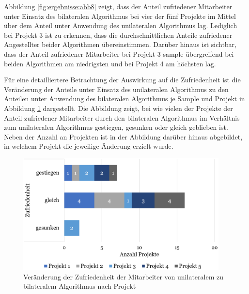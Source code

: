 Abbildung \ref{fig:ergebnisse:abb8} zeigt, dass der Anteil zufriedener Mitarbeiter unter Einsatz des bilateralen Algorithmus bei vier der fünf Projekte im Mittel über dem Anteil unter Anwendung des unilateralen Algorithmus lag.
Lediglich bei Projekt 3 ist zu erkennen, dass die durchschnittlichen Anteile zufriedener Angestellter beider Algorithmen übereinstimmen.
Darüber hinaus ist sichtbar, dass der Anteil zufriedener Mitarbeiter bei Projekt 3 sample-übergreifend bei beiden Algorithmen am niedrigsten und bei Projekt 4 am höchsten lag.

Für eine detailliertere Betrachtung der Auswirkung auf die Zufriedenheit ist die Veränderung der Anteile unter Einsatz des unilateralen Algorithmus zu den Anteilen unter Anwendung des bilateralen Algorithmus je Sample und Projekt in Abbildung \ref{fig:ergebnisse:abb9} dargestellt.
Die Abbildung zeigt, bei wie vielen der Projekte der Anteil zufriedener Mitarbeiter durch den bilateralen Algorithmus im Verhältnis zum unilateralen Algorithmus gestiegen, gesunken oder gleich geblieben ist.
Neben der Anzahl an Projekten ist in der Abbildung darüber hinaus abgebildet, in welchem Projekt die jeweilige Änderung erzielt wurde.

\begin{figure}
    \centering
	\includegraphics[width=0.95\textwidth]{gfx/verhaeltnis-z-projekte.png}
	\caption[Veränderung der Zufriedenheit der Mitarbeiter von unilateralem zu bilateralem Algorithmus nach Projekt]{Veränderung der Zufriedenheit der Mitarbeiter von unilateralem zu bilateralem Algorithmus nach Projekt}
	\label{fig:ergebnisse:abb9}
\end{figure}


